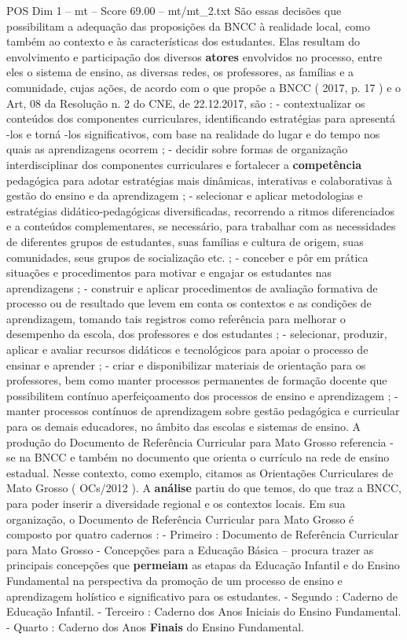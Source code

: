 \begin{textsample}{POS Dim 1 – mt – Score 69.00 – mt/mt\_2.txt}
São essas decisões que possibilitam a adequação das proposições da BNCC à realidade local, como também ao contexto e às características dos estudantes.
Elas resultam do envolvimento e participação dos diversos \textbf{atores} envolvidos no processo, entre eles o sistema de ensino, as diversas redes, os professores, as famílias e a comunidade, cujas ações, de acordo com o que propõe a BNCC ( 2017, p. 17 ) e o Art, 08 da Resolução n. 2 do CNE, de 22.12.2017, são : - contextualizar os conteúdos dos componentes curriculares, identificando estratégias para apresentá -los e torná -los significativos, com base na realidade do lugar e do tempo nos quais as aprendizagens ocorrem ; - decidir sobre formas de organização interdisciplinar dos componentes curriculares e fortalecer a \textbf{competência} pedagógica para adotar estratégias mais dinâmicas, interativas e colaborativas à gestão do ensino e da aprendizagem ; - selecionar e aplicar metodologias e estratégias didático-pedagógicas diversificadas, recorrendo a ritmos diferenciados e a conteúdos complementares, se necessário, para trabalhar com as necessidades de diferentes grupos de estudantes, suas famílias e cultura de origem, suas comunidades, seus grupos de socialização etc. ; - conceber e pôr em prática situações e procedimentos para motivar e engajar os estudantes nas aprendizagens ; - construir e aplicar procedimentos de avaliação formativa de processo ou de resultado que levem em conta os contextos e as condições de aprendizagem, tomando tais registros como referência para melhorar o desempenho da escola, dos professores e dos estudantes ; - selecionar, produzir, aplicar e avaliar recursos didáticos e tecnológicos para apoiar o processo de ensinar e aprender ; - criar e disponibilizar materiais de orientação para os professores, bem como manter processos permanentes de formação docente que possibilitem contínuo aperfeiçoamento dos processos de ensino e aprendizagem ; - manter processos contínuos de aprendizagem sobre gestão pedagógica e curricular para os demais educadores, no âmbito das escolas e sistemas de ensino.
A produção do Documento de Referência Curricular para Mato Grosso referencia -se na BNCC e também no documento que orienta o currículo na rede de ensino estadual.
Nesse contexto, como exemplo, citamos as Orientações Curriculares de Mato Grosso ( OCs/2012 ).
A \textbf{análise} partiu do que temos, do que traz a BNCC, para poder inserir a diversidade regional e os contextos locais.
Em sua organização, o Documento de Referência Curricular para Mato Grosso é composto por quatro cadernos : - Primeiro : Documento de Referência Curricular para Mato Grosso - Concepções para a Educação Básica – procura trazer as principais concepções que \textbf{permeiam} as etapas da Educação Infantil e do Ensino Fundamental na perspectiva da promoção de um processo de ensino e aprendizagem holístico e significativo para os estudantes. - Segundo : Caderno de Educação Infantil. - Terceiro : Caderno dos Anos Iniciais do Ensino Fundamental. - Quarto : Caderno dos Anos \textbf{Finais} do Ensino Fundamental.

\end{textsample}
